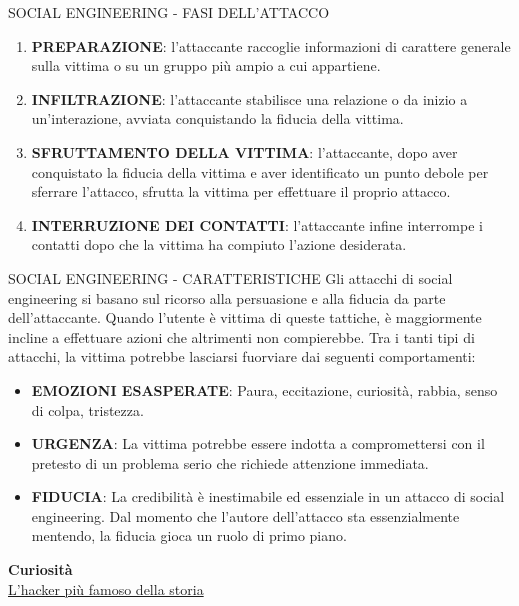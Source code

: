 \documentclass[aspectratio=1610]{beamer}
\begin{document}
\begin{frame}{SOCIAL ENGINEERING - FASI DELL'ATTACCO}
    \begin{enumerate}
        \item \textbf{PREPARAZIONE}: l'attaccante raccoglie informazioni di carattere generale sulla vittima 
        o su un gruppo più ampio a cui appartiene.
        \pause
        \item \textbf{INFILTRAZIONE}: l'attaccante stabilisce una relazione o da inizio a un'interazione, 
        avviata conquistando la fiducia della vittima.
        \pause
        \item \textbf{SFRUTTAMENTO DELLA VITTIMA}: l'attaccante, dopo aver conquistato la fiducia della vittima 
        e aver identificato un punto debole per sferrare l'attacco, sfrutta la vittima per effettuare il proprio attacco.
        \pause
        \item \textbf{INTERRUZIONE DEI CONTATTI}: l'attaccante infine interrompe i contatti dopo che la vittima ha compiuto l'azione desiderata.
    \end{enumerate}
\end{frame}

\begin{frame}{SOCIAL ENGINEERING - CARATTERISTICHE}
    Gli attacchi di social engineering si basano sul ricorso alla persuasione e alla fiducia da parte 
    dell'attaccante. Quando l'utente è vittima di queste tattiche, è maggiormente incline a effettuare 
    azioni che altrimenti non compierebbe. Tra i tanti tipi di attacchi, la vittima potrebbe lasciarsi fuorviare dai 
    seguenti comportamenti:
    \begin{itemize}
        \item \textbf{EMOZIONI ESASPERATE}: Paura, eccitazione, curiosità, rabbia, senso di colpa, tristezza.
        \pause
        \item \textbf{URGENZA}: La vittima potrebbe essere indotta a compromettersi con il pretesto di un problema 
        serio che richiede attenzione immediata.
        \pause
        \item \textbf{FIDUCIA}: La credibilità è inestimabile ed essenziale in un attacco di social engineering. 
        Dal momento che l'autore dell'attacco sta essenzialmente mentendo, la fiducia gioca un ruolo di primo piano.
    \end{itemize}
    \tiny{\textbf{Curiosità}}\\
    \tiny{\href{https://it.wikipedia.org/wiki/Kevin_Mitnick}{L'hacker più famoso della storia}}
\end{frame}
\end{document}
